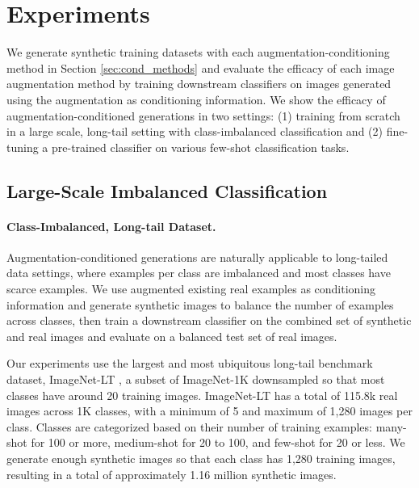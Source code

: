 \section{Experiments}
\vspace{-0.2cm}

We generate synthetic training datasets with each augmentation-conditioning method in Section \ref{sec:cond_methods} and evaluate the efficacy of each image augmentation method by training downstream classifiers on images generated using the augmentation as conditioning information.
We show the efficacy of augmentation-conditioned generations in two settings: (1) training from scratch in a large scale, long-tail setting with class-imbalanced classification and (2) fine-tuning a pre-trained classifier on various few-shot classification tasks.


\vspace{-0.2cm}
\subsection{Large-Scale Imbalanced Classification} \label{sec:class_imbalanced}

\paragraph{Class-Imbalanced, Long-tail Dataset.}
Augmentation-conditioned generations are naturally applicable to long-tailed data settings, where examples per class are imbalanced and most classes have scarce examples. We use augmented existing real examples as conditioning information and generate synthetic images to balance the number of examples across classes, then train a downstream classifier on the combined set of synthetic and real images and evaluate on a balanced test set of real images.

Our experiments use the largest and most ubiquitous long-tail benchmark dataset, ImageNet-LT \citep{imagenetLT}, a subset of ImageNet-1K \citep{imagenet} downsampled so that most classes have around 20 training images. 
ImageNet-LT has a total of 115.8k real images across 1K classes, with a minimum of 5 and maximum of 1,280 images per class.
Classes are categorized based on their number of training examples: many-shot for 100 or more, medium-shot for 20 to 100, and few-shot for 20 or less. We generate enough synthetic images so that each class has 1,280 training images, resulting in a total of approximately 1.16 million synthetic images.

